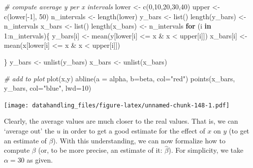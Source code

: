 \documentclass[
  12pt,
]{style/krantz}
\newenvironment{Shaded}{\begin{snugshade}}{\end{snugshade}}
\newcommand{\AttributeTok}[1]{\textcolor[rgb]{0.77,0.63,0.00}{#1}}
\newcommand{\CommentTok}[1]{\textcolor[rgb]{0.56,0.35,0.01}{\textit{#1}}}
\newcommand{\ControlFlowTok}[1]{\textcolor[rgb]{0.13,0.29,0.53}{\textbf{#1}}}
\newcommand{\DecValTok}[1]{\textcolor[rgb]{0.00,0.00,0.81}{#1}}
\newcommand{\FunctionTok}[1]{\textcolor[rgb]{0.00,0.00,0.00}{#1}}
\newcommand{\NormalTok}[1]{#1}
\newcommand{\OtherTok}[1]{\textcolor[rgb]{0.56,0.35,0.01}{#1}}
\newcommand{\SpecialCharTok}[1]{\textcolor[rgb]{0.00,0.00,0.00}{#1}}
\newcommand{\StringTok}[1]{\textcolor[rgb]{0.31,0.60,0.02}{#1}}
\begin{document}
\begin{Shaded}
\begin{Highlighting}[]
\CommentTok{\# compute average y per x intervals}
\NormalTok{lower }\OtherTok{\textless{}{-}} \FunctionTok{c}\NormalTok{(}\DecValTok{0}\NormalTok{,}\DecValTok{10}\NormalTok{,}\DecValTok{20}\NormalTok{,}\DecValTok{30}\NormalTok{,}\DecValTok{40}\NormalTok{)}
\NormalTok{upper }\OtherTok{\textless{}{-}} \FunctionTok{c}\NormalTok{(lower[}\SpecialCharTok{{-}}\DecValTok{1}\NormalTok{], }\DecValTok{50}\NormalTok{)}
\NormalTok{n\_intervals }\OtherTok{\textless{}{-}} \FunctionTok{length}\NormalTok{(lower)}
\NormalTok{y\_bars }\OtherTok{\textless{}{-}} \FunctionTok{list}\NormalTok{()}
\FunctionTok{length}\NormalTok{(y\_bars) }\OtherTok{\textless{}{-}}\NormalTok{ n\_intervals}
\NormalTok{x\_bars }\OtherTok{\textless{}{-}} \FunctionTok{list}\NormalTok{()}
\FunctionTok{length}\NormalTok{(x\_bars) }\OtherTok{\textless{}{-}}\NormalTok{ n\_intervals}
\ControlFlowTok{for}\NormalTok{ (i }\ControlFlowTok{in} \DecValTok{1}\SpecialCharTok{:}\NormalTok{n\_intervals)\{}
\NormalTok{  y\_bars[i] }\OtherTok{\textless{}{-}} \FunctionTok{mean}\NormalTok{(y[lower[i] }\SpecialCharTok{\textless{}=}\NormalTok{ x }\SpecialCharTok{\&}\NormalTok{ x }\SpecialCharTok{\textless{}}\NormalTok{ upper[i]])}
\NormalTok{  x\_bars[i] }\OtherTok{\textless{}{-}} \FunctionTok{mean}\NormalTok{(x[lower[i] }\SpecialCharTok{\textless{}=}\NormalTok{ x }\SpecialCharTok{\&}\NormalTok{ x }\SpecialCharTok{\textless{}}\NormalTok{ upper[i]])}

\NormalTok{\}}
\NormalTok{y\_bars }\OtherTok{\textless{}{-}} \FunctionTok{unlist}\NormalTok{(y\_bars)}
\NormalTok{x\_bars }\OtherTok{\textless{}{-}} \FunctionTok{unlist}\NormalTok{(x\_bars)}

\CommentTok{\# add to plot}
\FunctionTok{plot}\NormalTok{(x,y)}
\FunctionTok{abline}\NormalTok{(}\AttributeTok{a =}\NormalTok{ alpha, }\AttributeTok{b=}\NormalTok{beta, }\AttributeTok{col=}\StringTok{"red"}\NormalTok{)}
\FunctionTok{points}\NormalTok{(x\_bars, y\_bars, }\AttributeTok{col=}\StringTok{"blue"}\NormalTok{, }\AttributeTok{lwd=}\DecValTok{10}\NormalTok{)}
\end{Highlighting}
\end{Shaded}

\texttt{[image: datahandling\_files/figure-latex/unnamed-chunk-148-1.pdf]}

Clearly, the average values are much closer to the real values. That is, we can `average out' the \(u\) in order to get a good estimate for the effect of \(x\) on \(y\) (to get an estimate of \(\beta\)). With this understanding, we can now formalize how to compute \(\beta\) (or, to be more precise, an estimate of it: \(\hat{\beta}\)). For simplicity, we take \(\alpha=30\) as given.
\end{document}

